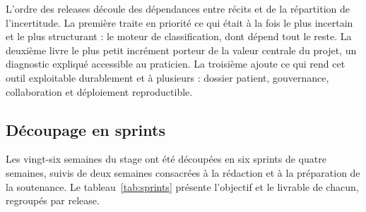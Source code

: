 L'ordre des releases découle des dépendances entre récits et de la répartition de
l'incertitude. La première traite en priorité ce qui était à la fois le plus incertain et le
plus structurant : le moteur de classification, dont dépend tout le reste. La deuxième livre
le plus petit incrément porteur de la valeur centrale du projet, un diagnostic expliqué
accessible au praticien. La troisième ajoute ce qui rend cet outil exploitable durablement
et à plusieurs : dossier patient, gouvernance, collaboration et déploiement reproductible.
\subsection{Découpage en sprints}

Les vingt-six semaines du stage ont été découpées en six sprints de quatre semaines, suivis
de deux semaines consacrées à la rédaction et à la préparation de la soutenance. Le
tableau~\ref{tab:sprints} présente l'objectif et le livrable de chacun, regroupés par
release.

